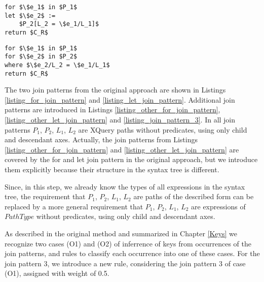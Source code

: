 \begin{lstlisting}[mathescape, float, caption=Other form of the let join pattern., frame=single, label=listing_other_let_join_pattern]
for $\$e_1$ in $P_1$
let $\$e_2$ :=
    $P_2[L_2 = \$e_1/L_1]$
return $C_R$
\end{lstlisting}

\begin{lstlisting}[mathescape, float, caption=Join pattern 3., frame=single, label=listing_join_pattern_3]
for $\$e_1$ in $P_1$
for $\$e_2$ in $P_2$
where $\$e_2/L_2 = \$e_1/L_1$
return $C_R$
\end{lstlisting}

The two join patterns from the original approach are shown in Listings \ref{listing_for_join_pattern} and \ref{listing_let_join_pattern}. Additional join patterns are introduced in Listings \ref{listing_other_for_join_pattern}, \ref{listing_other_let_join_pattern} and \ref{listing_join_pattern_3}. In all join patterns $P_1$, $P_2$, $L_1$, $L_2$ are XQuery paths without predicates, using only child and descendant axes. Actually, the join patterns from Listings \ref{listing_other_for_join_pattern} and \ref{listing_other_let_join_pattern} are covered by the for and let join pattern in the original approach, but we introduce them explicitly because their structure in the syntax tree is different.

Since, in this step, we already know the types of all expressions in the syntax tree, the requirement that $P_1$, $P_2$, $L_1$, $L_2$ are paths of the described form can be replaced by a more general requirement that $P_1$, $P_2$, $L_1$, $L_2$ are expressions of $PathType$ without predicates, using only child and descendant axes.

As described in the original method and summarized in Chapter \ref{Keys} we recognize two cases (O1) and (O2) of inferrence of keys from occurrences of the join patterns, and rules to classify each occurrence into one of these cases. For the join pattern 3, we introduce a new rule, considering the join pattern 3 of case (O1), assigned with weight of 0.5. 

